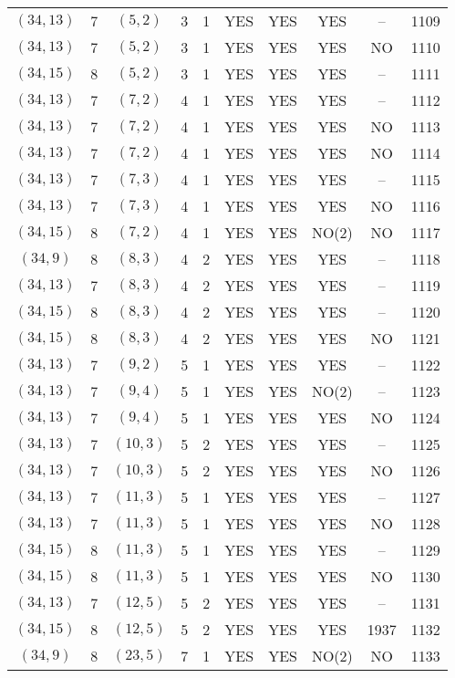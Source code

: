 \begin{longtable}{|c|c|c|c|c|c|c|c|c|c|}
$(34, 13)$ & 7 & $(5, 2)$ & 3 & 1 & YES & YES & YES & -- & 1109\\
$(34, 13)$ & 7 & $(5, 2)$ & 3 & 1 & YES & YES & YES & NO & 1110\\
$(34, 15)$ & 8 & $(5, 2)$ & 3 & 1 & YES & YES & YES & -- & 1111\\
$(34, 13)$ & 7 & $(7, 2)$ & 4 & 1 & YES & YES & YES & -- & 1112\\
$(34, 13)$ & 7 & $(7, 2)$ & 4 & 1 & YES & YES & YES & NO & 1113\\
$(34, 13)$ & 7 & $(7, 2)$ & 4 & 1 & YES & YES & YES & NO & 1114\\
$(34, 13)$ & 7 & $(7, 3)$ & 4 & 1 & YES & YES & YES & -- & 1115\\
$(34, 13)$ & 7 & $(7, 3)$ & 4 & 1 & YES & YES & YES & NO & 1116\\
$(34, 15)$ & 8 & $(7, 2)$ & 4 & 1 & YES & YES & NO(2) & NO & 1117\\
$(34, 9)$ & 8 & $(8, 3)$ & 4 & 2 & YES & YES & YES & -- & 1118\\
$(34, 13)$ & 7 & $(8, 3)$ & 4 & 2 & YES & YES & YES & -- & 1119\\
$(34, 15)$ & 8 & $(8, 3)$ & 4 & 2 & YES & YES & YES & -- & 1120\\
$(34, 15)$ & 8 & $(8, 3)$ & 4 & 2 & YES & YES & YES & NO & 1121\\
$(34, 13)$ & 7 & $(9, 2)$ & 5 & 1 & YES & YES & YES & -- & 1122\\
$(34, 13)$ & 7 & $(9, 4)$ & 5 & 1 & YES & YES & NO(2) & -- & 1123\\
$(34, 13)$ & 7 & $(9, 4)$ & 5 & 1 & YES & YES & YES & NO & 1124\\
$(34, 13)$ & 7 & $(10, 3)$ & 5 & 2 & YES & YES & YES & -- & 1125\\
$(34, 13)$ & 7 & $(10, 3)$ & 5 & 2 & YES & YES & YES & NO & 1126\\
$(34, 13)$ & 7 & $(11, 3)$ & 5 & 1 & YES & YES & YES & -- & 1127\\
$(34, 13)$ & 7 & $(11, 3)$ & 5 & 1 & YES & YES & YES & NO & 1128\\
$(34, 15)$ & 8 & $(11, 3)$ & 5 & 1 & YES & YES & YES & -- & 1129\\
$(34, 15)$ & 8 & $(11, 3)$ & 5 & 1 & YES & YES & YES & NO & 1130\\
$(34, 13)$ & 7 & $(12, 5)$ & 5 & 2 & YES & YES & YES & -- & 1131\\
$(34, 15)$ & 8 & $(12, 5)$ & 5 & 2 & YES & YES & YES & 1937 & 1132\\
$(34, 9)$ & 8 & $(23, 5)$ & 7 & 1 & YES & YES & NO(2) & NO & 1133\\

\end{longtable}
